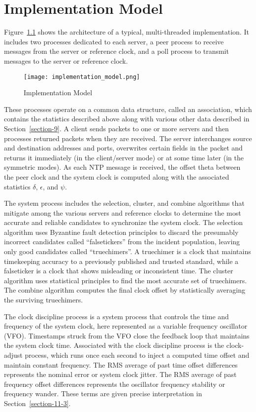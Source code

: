 \chapter{Implementation Model}
\label{section-5}

Figure~\ref{implementation_model} shows the architecture of a typical, multi-threaded
implementation. It includes two processes dedicated to each server,
a peer process to receive messages from the server or reference
clock, and a poll process to transmit messages to the server or
reference clock.

\begin{figure}
\centering
\texttt{[image: implementation\_model.png]}
\caption{Implementation Model}
\label{implementation_model}
\end{figure}

These processes operate on a common data structure, called an
association, which contains the statistics described above along with
various other data described in Section~\ref{section-9}. A client sends packets to
one or more servers and then processes returned packets when they are
received. The server interchanges source and destination addresses
and ports, overwrites certain fields in the packet and returns it
immediately (in the client/server mode) or at some time later (in the
symmetric modes). As each NTP message is received, the offset theta
between the peer clock and the system clock is computed along with
the associated statistics $ \delta $, $ \epsilon $, and $ \psi $.

The system process includes the selection, cluster, and combine
algorithms that mitigate among the various servers and reference
clocks to determine the most accurate and reliable candidates to
synchronize the system clock. The selection algorithm uses Byzantine
fault detection principles to discard the presumably incorrect
candidates called ``falsetickers'' from the incident population,
leaving only good candidates called ``truechimers''. A truechimer is a
clock that maintains timekeeping accuracy to a previously published
and trusted standard, while a falseticker is a clock that shows
misleading or inconsistent time. The cluster algorithm uses
statistical principles to find the most accurate set of truechimers.
The combine algorithm computes the final clock offset by
statistically averaging the surviving truechimers.

The clock discipline process is a system process that controls the
time and frequency of the system clock, here represented as a
variable frequency oscillator (VFO). Timestamps struck from the VFO
close the feedback loop that maintains the system clock time.
Associated with the clock discipline process is the clock-adjust
process, which runs once each second to inject a computed time offset
and maintain constant frequency. The RMS average of past time offset
differences represents the nominal error or system clock jitter. The
RMS average of past frequency offset differences represents the
oscillator frequency stability or frequency wander. These terms are
given precise interpretation in Section~\ref{section-11-3}.

